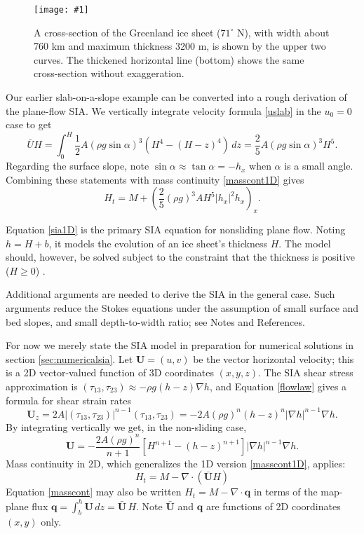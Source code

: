 \documentclass[letterpaper,final,12pt,reqno]{amsart}
\newcommand{\bq}{\mathbf{q}}
\newcommand{\Div}{\nabla\cdot}
\newcommand{\onefigsize}[3]{
\begin{figure}[ht]
\centering
\texttt{[image: \#1]}
\caption{#2}
\label{fig:#1}
\end{figure}}
\begin{document}
\medskip

\onefigsize{green-transect}{A cross-section of the Greenland ice sheet ($71^\circ$ N), with width about 760 km and maximum thickness 3200 m, is shown by the upper two curves.  The thickened horizontal line (bottom) shows the same cross-section without exaggeration.}{4.0in}

Our earlier slab-on-a-slope example can be converted into a rough derivation of the plane-flow SIA.  We vertically integrate velocity formula \eqref{uslab} in the $u_0=0$ case to get
\begin{equation}
\bar U H = \int_0^H \frac{1}{2} A (\rho g \sin\alpha)^3  \left(H^4 - (H-z)^4\right)\,dz = \frac{2}{5} A (\rho g \sin\alpha)^3 H^5. \label{siaubar}
\end{equation}
Regarding the surface slope, note $\sin \alpha \approx \tan\alpha = - h_x$ when $\alpha$ is a small angle.  Combining these statements with mass continuity \eqref{masscont1D} gives
\begin{equation}
  H_t = M + \left(\frac{2}{5} (\rho g)^3 A H^5 |h_x|^2 h_x\right)_x. \label{sia1D}
\end{equation}

Equation \eqref{sia1D} is the primary SIA equation for nonsliding plane flow.  Noting $h=H+b$, it models the evolution of an ice sheet's thickness $H$.  The model should, however, be solved subject to the constraint that the thickness is positive ($H\ge 0$) \cite{Bueler2016,JouvetBueler2012}.

Additional arguments are needed to derive the SIA in the general case.  Such arguments reduce the Stokes equations under the assumption of small surface and bed slopes, and small depth-to-width ratio; see Notes and References.

For now we merely state the SIA model in preparation for numerical solutions in section \ref{sec:numericalsia}.  Let $\mathbf{U} = (u,v)$ be the vector horizontal velocity; this is a 2D vector-valued function of 3D coordinates $(x,y,z)$.  The SIA shear stress approximation is $(\tau_{13},\tau_{23}) \approx - \rho g (h-z) \nabla h$, and Equation \eqref{flowlaw} gives a formula for shear strain rates
\begin{equation*}
\mathbf{U}_z = 2 A |(\tau_{13},\tau_{23})|^{n-1} (\tau_{13},\tau_{23}) = - 2 A (\rho g)^n (h-z)^n |\nabla h|^{n-1} \nabla h.
\end{equation*}
By integrating vertically we get, in the non-sliding case,
\begin{equation}
\mathbf{U} = - \frac{2 A (\rho g)^n}{n+1} \left[H^{n+1} - (h-z)^{n+1}\right] |\nabla h|^{n-1} \nabla h.  \label{siavelocity}
\end{equation}
Mass continuity in 2D, which generalizes the 1D version \eqref{masscont1D}, applies:
\begin{equation}
    H_t = M - \Div\left(\bar{\mathbf{U}} H\right)  \label{masscont}
\end{equation}
Equation \eqref{masscont} may also be written $H_t = M - \Div \bq$ in terms of the map-plane flux $\bq = \int_{b}^{h} \mathbf{U}\,dz = \bar{\mathbf{U}}\,H$.  Note $\bar{\mathbf{U}}$ and $\bq$ are functions of 2D coordinates $(x,y)$ only.
\end{document}
